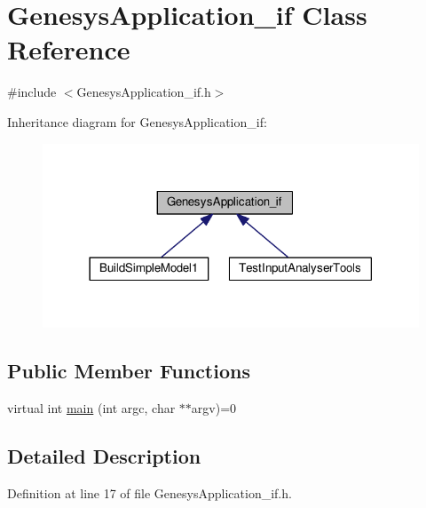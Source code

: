 \hypertarget{class_genesys_application__if}{\section{Genesys\-Application\-\_\-if Class Reference}
\label{class_genesys_application__if}
}


{\ttfamily \#include $<$Genesys\-Application\-\_\-if.\-h$>$}



Inheritance diagram for Genesys\-Application\-\_\-if\-:\nopagebreak
\begin{figure}[H]
\begin{center}
\leavevmode
\includegraphics[width=318pt]{class_genesys_application__if__inherit__graph}
\end{center}
\end{figure}
\subsection*{Public Member Functions}
\begin{DoxyCompactItemize}
\item 
virtual int \hyperlink{class_genesys_application__if_a2b07e7803b410a4a8d0f87422dabb004}{main} (int argc, char $\ast$$\ast$argv)=0
\end{DoxyCompactItemize}


\subsection{Detailed Description}


Definition at line 17 of file Genesys\-Application\-\_\-if.\-h.



